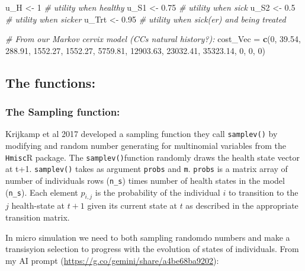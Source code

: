 \documentclass[
]{article}
\newenvironment{Shaded}{\begin{snugshade}}{\end{snugshade}}
\newcommand{\CommentTok}[1]{\textcolor[rgb]{0.56,0.35,0.01}{\textit{#1}}}
\newcommand{\DecValTok}[1]{\textcolor[rgb]{0.00,0.00,0.81}{#1}}
\newcommand{\FloatTok}[1]{\textcolor[rgb]{0.00,0.00,0.81}{#1}}
\newcommand{\FunctionTok}[1]{\textcolor[rgb]{0.13,0.29,0.53}{\textbf{#1}}}
\newcommand{\NormalTok}[1]{#1}
\newcommand{\OtherTok}[1]{\textcolor[rgb]{0.56,0.35,0.01}{#1}}
\begin{document}
\begin{Shaded}
\begin{Highlighting}[]
\NormalTok{u\_H     }\OtherTok{\textless{}{-}} \DecValTok{1}                   \CommentTok{\# utility when healthy }
\NormalTok{u\_S1    }\OtherTok{\textless{}{-}} \FloatTok{0.75}                \CommentTok{\# utility when sick }
\NormalTok{u\_S2    }\OtherTok{\textless{}{-}} \FloatTok{0.5}                 \CommentTok{\# utility when sicker }
\NormalTok{u\_Trt   }\OtherTok{\textless{}{-}} \FloatTok{0.95}                \CommentTok{\# utility when sick(er) and being treated}

\CommentTok{\# From our Markov cervix model (CC\textquotesingle{}s natural history?):}
\NormalTok{cost\_Vec }\OtherTok{=} \FunctionTok{c}\NormalTok{(}\DecValTok{0}\NormalTok{, }\FloatTok{39.54}\NormalTok{, }\FloatTok{288.91}\NormalTok{, }\FloatTok{1552.27}\NormalTok{, }\FloatTok{1552.27}\NormalTok{, }
             \FloatTok{5759.81}\NormalTok{, }\FloatTok{12903.63}\NormalTok{, }\FloatTok{23032.41}\NormalTok{, }\FloatTok{35323.14}\NormalTok{, }\DecValTok{0}\NormalTok{, }\DecValTok{0}\NormalTok{, }\DecValTok{0}\NormalTok{)}
\end{Highlighting}
\end{Shaded}

\hypertarget{the-functions}{%
\subsection{The functions:}\label{the-functions}}

\hypertarget{the-sampling-function}{%
\subsubsection{The Sampling function:}\label{the-sampling-function}}

Krijkamp et al 2017 developed a sampling function they call
\texttt{samplev()} by modifying and random number generating for
multinomial variables from the \texttt{Hmisc}R package. The
\texttt{samplev()}function randomly draws the health state vector at
t+1. \texttt{samplev()} takes as argument \texttt{probs} and \texttt{m}.
\texttt{probs} is a matrix array of number of individuals rows
(\texttt{n\_s}) times number of health states in the model
(\texttt{n\_s}). Each element \(p_{i,j}\) is the probability of the
individual \(i\) to transition to the \(j\) health-state at \(t+1\)
given its current state at \(t\) as described in the appropriate
transition matrix.

In micro simulation we need to both sampling randomdo numbers and make a
transisyion selection to progress with the evolution of states of
individuals. From my AI prompt
(\url{https://g.co/gemini/share/a4be68ba9202}):
\end{document}
